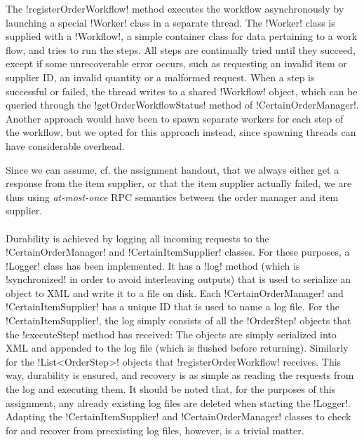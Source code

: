 \documentclass[a4paper, 12pt]{article}
\begin{document}
The !registerOrderWorkflow! method executes the workflow
asynchronously by launching a special !Worker! class in a separate
thread. The !Worker! class is supplied with a !Workflow!, a simple
container class for data pertaining to a work flow, and tries to run
the steps. All steps are continually tried until they succeed, except
if some unrecoverable error occurs, such as requesting an invalid item
or supplier ID, an invalid quantity or a malformed request. When a
step is successful or failed, the thread writes to a shared !Workflow!
object, which can be queried through the !getOrderWorkflowStatus!
method of !CertainOrderManager!. Another approach would have been to
spawn separate workers for each step of the workflow, but we opted for
this approach instead, since spawning threads can have considerable
overhead.

Since we can assume, cf. the
assignment handout, that we always either get a response from the item
supplier, or that the item supplier actually failed, we are thus using
\emph{at-most-once} RPC semantics between the order manager and item
supplier.

\paragraph{}

Durability is achieved by logging all incoming requests to the
!CertainOrderManager! and !CertainItemSupplier! classes. For these
purposes, a !Logger! class has been implemented. It has a !log! method
(which is !synchronized! in order to avoid interleaving outputs) that
is used to serialize an object to XML and write it to a file on
disk. Each !CertainOrderManager! and !CertainItemSupplier! has a
unique ID that is used to name a log file. For the
!CertainItemSupplier!, the log simply consists of all the !OrderStep!
objects that the !executeStep! method has received: The objects are
simply serialized into XML and appended to the log file (which is
flushed before returning). Similarly for the !List<OrderStep>! objects
that !registerOrderWorkflow! receives. This way, durability is
ensured, and recovery is as simple as reading the requests from the
log and executing them. It should be noted that, for the purposes of
this assignment, any already existing log files are deleted when
starting the !Logger!. Adapting the !CertainItemSupplier! and
!CertainOrderManager! classes to check for and recover from
preexisting log files, however, is a trivial matter.

\paragraph{}
\end{document}
